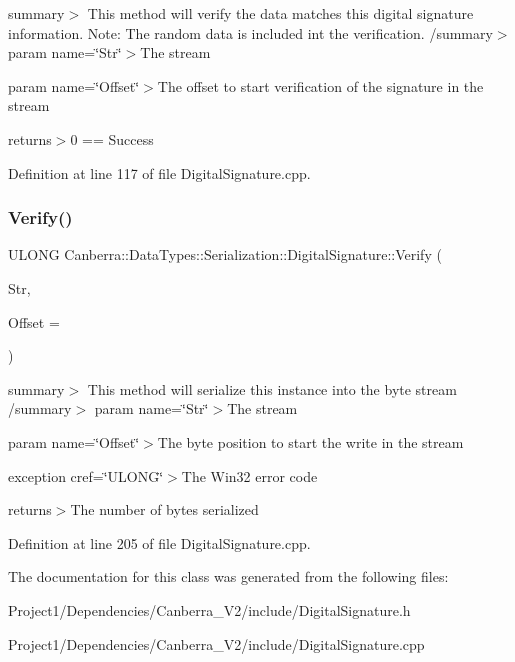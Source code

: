 summary$>$ This method will verify the data matches this digital signature information. Note\+: The random data is included int the verification. /summary$>$ param name=\char`\"{}\+Str\char`\"{}$>$The stream

param name=\char`\"{}\+Offset\char`\"{}$>$The offset to start verification of the signature in the stream

returns$>$0 == Success

Definition at line 117 of file Digital\+Signature.\+cpp.

\mbox{\label{class_canberra_1_1_data_types_1_1_serialization_1_1_digital_signature_a338d5cd12ad24843b358e1d996429b4c_a338d5cd12ad24843b358e1d996429b4c}} 
\subsubsection{\texorpdfstring{Verify()}{Verify()}}
{\footnotesize\ttfamily U\+L\+O\+NG Canberra\+::\+Data\+Types\+::\+Serialization\+::\+Digital\+Signature\+::\+Verify (\begin{DoxyParamCaption}\item[{const \hyperlink{class_canberra_1_1_utility_1_1_core_1_1_byte_stream}{Canberra\+::\+Utility\+::\+Core\+::\+Byte\+Stream} \&}]{Str,  }\item[{const L\+O\+NG}]{Offset = {} }\end{DoxyParamCaption})}

summary$>$ This method will serialize this instance into the byte stream /summary$>$ param name=\char`\"{}\+Str\char`\"{}$>$The stream

param name=\char`\"{}\+Offset\char`\"{}$>$The byte position to start the write in the stream

exception cref=\char`\"{}\+U\+L\+O\+N\+G\char`\"{}$>$The Win32 error code

returns$>$The number of bytes serialized

Definition at line 205 of file Digital\+Signature.\+cpp.



The documentation for this class was generated from the following files\+:\begin{DoxyCompactItemize}
\item 
Project1/\+Dependencies/\+Canberra\+\_\+\+V2/include/Digital\+Signature.\+h\item 
Project1/\+Dependencies/\+Canberra\+\_\+\+V2/include/Digital\+Signature.\+cpp\end{DoxyCompactItemize}
